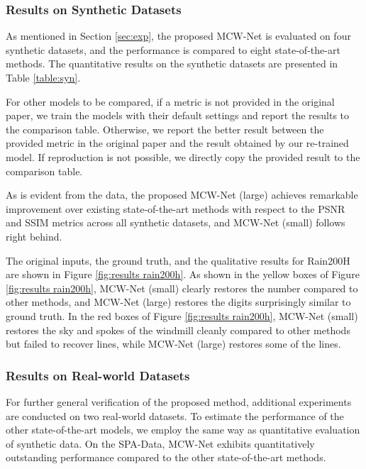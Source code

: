 \documentclass[a4paper,fleqn]{cas-dc}
\begin{document}
\subsubsection{Results on Synthetic Datasets}
\label{subsec:results_synthetic}



As mentioned in Section \ref{sec:exp}, the proposed MCW-Net is evaluated on four synthetic datasets, and the performance is compared to eight state-of-the-art methods. The quantitative results on the synthetic datasets are presented in Table \ref{table:syn}. 


For other models to be compared, if a metric is not provided in the original paper, we train the models with their default settings and report the results to the comparison table.  Otherwise, we report the better result between the provided metric in the original paper and the result obtained by our re-trained model. If reproduction is not possible, we directly copy the provided result to the comparison table.

As is evident from the data, the proposed MCW-Net (large) achieves remarkable improvement over existing state-of-the-art methods with respect to the PSNR and SSIM metrics across all synthetic datasets, and MCW-Net (small) follows right behind. 

The original inputs, the ground truth, and the qualitative results for Rain200H are shown in Figure \ref{fig:results rain200h}. As shown in the yellow boxes of Figure \ref{fig:results rain200h}, MCW-Net (small) clearly restores the number compared to other methods, and MCW-Net (large) restores the digits surprisingly similar to ground truth. In the red boxes of Figure \ref{fig:results rain200h}, MCW-Net (small) restores the sky and spokes of the windmill cleanly compared to other methods but failed to recover lines, while MCW-Net (large) restores some of the lines.

\subsubsection{Results on Real-world Datasets} 






For further general verification of the proposed method, additional experiments are conducted on two real-world datasets. To estimate the performance of the other state-of-the-art models, we employ the same way as quantitative evaluation of synthetic data. On the SPA-Data, MCW-Net exhibits quantitatively outstanding performance compared to the other state-of-the-art methods.
\end{document}
